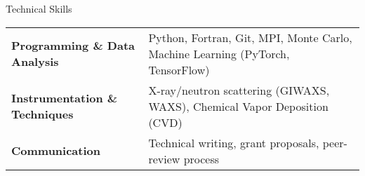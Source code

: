 
\begin{rubric}{Technical Skills}
\begin{tabular}{@{}ll@{}}
\textbf{Programming \& Data Analysis} & Python, Fortran, Git, MPI, Monte Carlo, Machine Learning (PyTorch, TensorFlow) \\
\textbf{Instrumentation \& Techniques} & X-ray/neutron scattering (GIWAXS, WAXS), Chemical Vapor Deposition (CVD)\\
\textbf{Communication} & Technical writing, grant proposals, peer-review process\\
\end{tabular}
\end{rubric}

